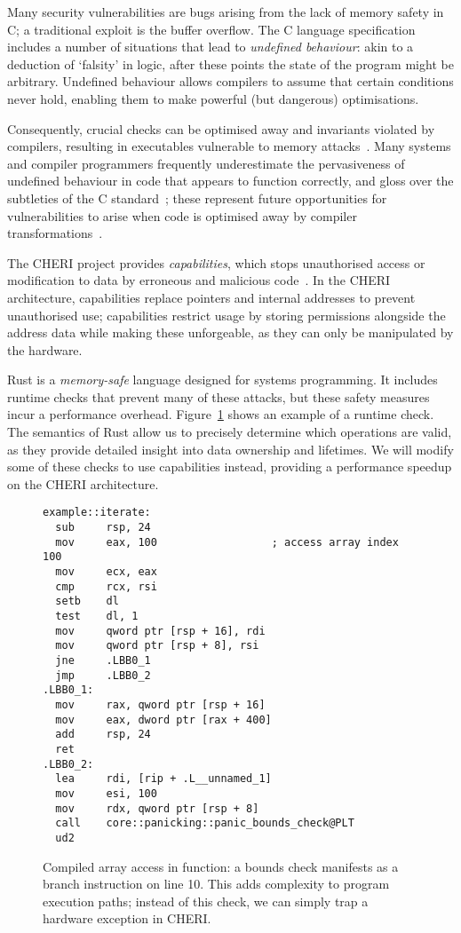 \documentclass[11pt]{article}
\begin{document}
Many security vulnerabilities are bugs arising from the lack of memory safety in C; a traditional exploit is the buffer overflow.
The C language specification includes a number of situations that lead to \emph{undefined behaviour}: akin to a deduction of `falsity' in logic, after these points the state of the program might be arbitrary.
Undefined behaviour allows compilers to assume that certain conditions never hold, enabling them to make powerful (but dangerous) optimisations.

Consequently, crucial checks can be optimised away and invariants violated by compilers, resulting in executables vulnerable to memory attacks~\cite{simon2018wygiwyc}.
Many systems and compiler programmers frequently underestimate the pervasiveness of undefined behaviour in code that appears to function correctly, and gloss over the subtleties of the C standard~\cite{memarian2016cdepths};
these represent future opportunities for vulnerabilities to arise when code is optimised away by compiler transformations~\cite{wang2013towards}.

The CHERI project provides \emph{capabilities}, which stops unauthorised access or modification to data by erroneous and malicious code~\cite{cheri-v6}.
In the CHERI architecture, capabilities replace pointers and internal addresses to prevent unauthorised use; capabilities restrict usage by storing permissions alongside the address data while making these unforgeable, as they can only be manipulated by the hardware.

Rust is a \emph{memory-safe} language designed for systems programming.
It includes runtime checks that prevent many of these attacks, but these safety measures incur a performance overhead.
Figure~\ref{lst:array-check} shows an example of a runtime check.
The semantics of Rust allow us to precisely determine which operations are valid, as they provide detailed insight into data ownership and lifetimes.
We will modify some of these checks to use capabilities instead, providing a performance speedup on the CHERI architecture.

\begin{figure}[ht]
\begin{lstlisting}
example::iterate:
  sub     rsp, 24
  mov     eax, 100                  ; access array index 100
  mov     ecx, eax
  cmp     rcx, rsi
  setb    dl
  test    dl, 1
  mov     qword ptr [rsp + 16], rdi
  mov     qword ptr [rsp + 8], rsi
  jne     .LBB0_1
  jmp     .LBB0_2
.LBB0_1:
  mov     rax, qword ptr [rsp + 16]
  mov     eax, dword ptr [rax + 400]
  add     rsp, 24
  ret
.LBB0_2:
  lea     rdi, [rip + .L__unnamed_1]
  mov     esi, 100
  mov     rdx, qword ptr [rsp + 8]
  call    core::panicking::panic_bounds_check@PLT
  ud2
\end{lstlisting}
\caption{Compiled array access in function: a bounds check manifests as a branch instruction on line 10. This adds complexity to program execution paths; instead of this check, we can simply trap a hardware exception in CHERI.}
\label{lst:array-check}
\end{figure}
\end{document}
